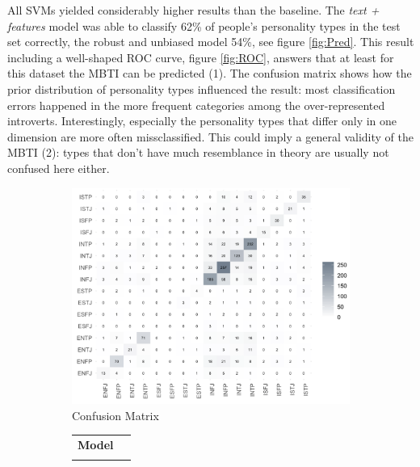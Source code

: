 All SVMs yielded considerably higher results than the baseline. The \textit{text + features} model was able to classify 62\% of people's personality types in the test set correctly, the robust and unbiased model 54\%, see figure \ref{fig:Pred}. This result including a well-shaped ROC curve, figure \ref{fig:ROC}, answers that at least for this dataset the MBTI can be predicted (1). The confusion matrix shows how the prior distribution of personality types influenced the result: most classification errors happened in the more frequent categories among the over-represented introverts. Interestingly, especially the personality types that differ only in one dimension are more often missclassified. This could imply a general validity of the MBTI (2): types that don't have much resemblance in theory are usually not confused here either.
\begin{figure}[b]
\centering
    \begin{subfigure}[b]{.6\textwidth}
      \raggedright
      \includegraphics[width=\textwidth]{confusionmatrixlabels.png}
        \caption{Confusion Matrix} %
        \label{fig:Conf}
    \end{subfigure}%
    \quad %
    \begin{subfigure}[b]{.35\textwidth}
        \raggedleft
        \label{tab:Pred}
        \begin{tabular}{ll}
            \hline\noalign{\smallskip}
            \textbf{Model} & \\
            \noalign{\smallskip}\hline\noalign{\smallskip}

\end{tabular}
\end{subfigure}
\end{figure}
